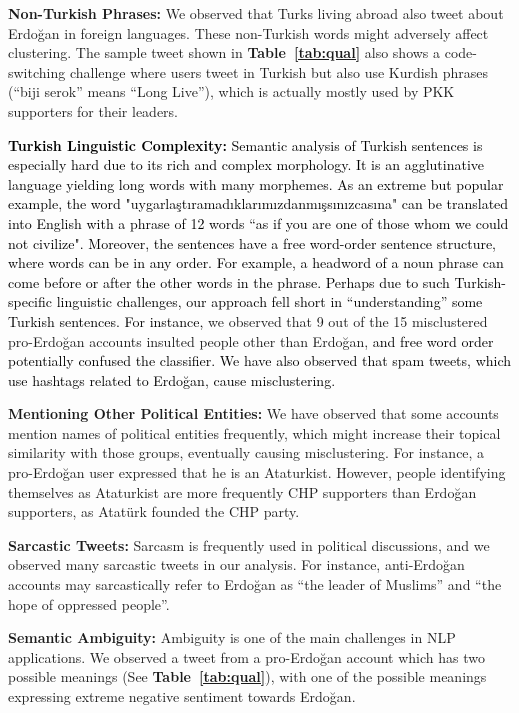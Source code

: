 \documentclass[letterpaper]{article} \usepackage{aaai20}  \usepackage{times}  \usepackage{stackengine}
\newcommand{\changes}{\textcolor{black}}
\begin{document}
 \noindent
      \textbf{Non-Turkish Phrases:} We observed that Turks living abroad also tweet about Erdo\u{g}an in foreign languages. These non-Turkish words might adversely affect clustering. The sample tweet shown in \textbf{Table~\ref{tab:qual}} also shows a code-switching challenge where users tweet in Turkish but also use Kurdish phrases (``biji serok'' means ``Long Live''), which is actually mostly used by PKK supporters for their leaders.
     
     \noindent
      \changes{\textbf{Turkish Linguistic Complexity:} Semantic analysis of Turkish sentences is especially hard due to its rich and complex morphology. It is an agglutinative language yielding long words with many morphemes. As an extreme but popular example, the word "uygarla\c{s}t{\i}ramad{\i}klar{\i}m{\i}zdanm{\i}\c{s}s{\i}n{\i}zcas{\i}na" can be translated into English with a phrase of 12 words ``as if you are one of those whom we could not civilize". Moreover, the sentences have a free word-order sentence structure, where words can be in any order. For example, a headword of a noun phrase can come before or after the other words in the phrase. Perhaps due to such Turkish-specific linguistic challenges, our approach fell short in ``understanding'' some Turkish sentences. For instance,}  we observed that 9 out of the 15 misclustered pro-Erdo\u{g}an accounts insulted people other than Erdo\u{g}an, \changes{ and free word order potentially confused the classifier.   
We have also observed that spam tweets, which use hashtags related to Erdo\u{g}an, cause misclustering. 
       } 
       
       \noindent
       \textbf{Mentioning Other Political Entities:} We have observed that 
       some accounts mention names of political entities frequently, which might increase their topical similarity with those groups, eventually causing misclustering. For instance, a pro-Erdo\u{g}an user expressed that he is an Ataturkist. However, people identifying themselves as Ataturkist are more frequently CHP supporters than Erdo\u{g}an supporters, as Atat\"{u}rk founded the CHP party.  
       
       \noindent
       \textbf{Sarcastic Tweets:} Sarcasm is frequently used in political discussions, and we observed many sarcastic tweets in our analysis. For instance, anti-Erdo\u{g}an accounts may sarcastically refer to Erdo\u{g}an as ``the leader of Muslims'' and ``the hope of oppressed people''. 
       
       \noindent
       \textbf{Semantic Ambiguity:} Ambiguity is one of the main challenges in NLP applications. We observed a tweet from a pro-Erdo\u{g}an account which has two possible meanings (See \textbf{Table~\ref{tab:qual}}), with one of the possible meanings expressing extreme negative sentiment towards Erdo\u{g}an.
       
\end{document}
